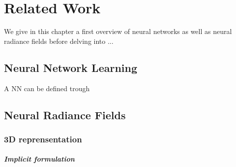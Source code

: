 \chapter{Related Work}
\label{chapter:related}




We give in this chapter a first overview of neural networks as well as neural radiance fields before delving into ... 

\section{Neural Network Learning}

A \ac{NN} can be defined trough 
\section{Neural Radiance Fields}

\subsection{3D reprensentation}\label{section:chapter1_3Drepresentation}

\paragraph{Implicit formulation}
